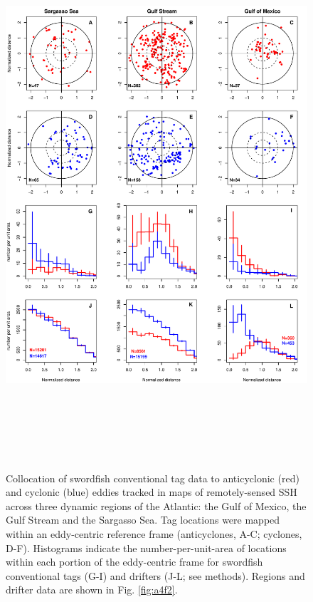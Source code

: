 \begin{figure}[htbp]
\centering
\includegraphics[height=8in, keepaspectratio]{images/C4_Fig5.pdf}
\caption[Collocation of swordfish conventional tag data to anticyclonic and cyclonic eddies across three dynamic regions of the Atlantic]{Collocation of swordfish conventional tag data to anticyclonic (red) and cyclonic (blue) eddies tracked in maps of remotely-sensed SSH across three dynamic regions of the Atlantic: the Gulf of Mexico, the Gulf Stream and the Sargasso Sea. Tag locations were mapped within an eddy-centric reference frame (anticyclones, A-C; cyclones, D-F). Histograms indicate the number-per-unit-area of locations within each portion of the eddy-centric frame for swordfish conventional tags (G-I) and drifters (J-L; see methods). Regions and drifter data are shown in Fig. \ref{fig:a4f2}.}
\label{fig:c4f5}
\end{figure}

